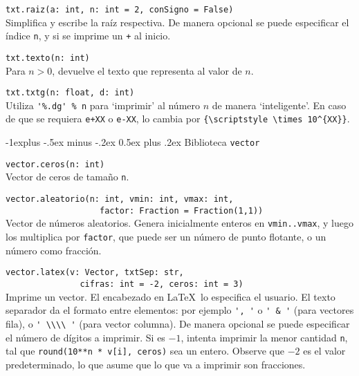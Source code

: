\documentclass[10pt,landscape]{article}
\makeatletter
\renewcommand{\subsection}{\@startsection{subsection}{2}{0mm}%
                                {-1explus -.5ex minus -.2ex}%
                                {0.5ex plus .2ex}%
                                {\normalfont\normalsize\bfseries}}
\makeatother
\begin{document}
\begin{multicols}{3}
\begin{asparaitem}
\item  \verb|txt.raiz(a: int, n: int = 2, conSigno = False)| \\
\quad Simplifica y escribe la raíz respectiva. De manera opcional se puede especificar el \'indice \verb|n|, y si se imprime un \verb|+| al inicio.

\item \verb|txt.texto(n: int)| \\
\quad Para $n > 0$, devuelve el texto que representa al valor de $n$.

\item \verb|txt.txtg(n: float, d: int)| \\
  \quad Utiliza \verb|'%.dg' % n| para `imprimir' al n\'umero $n$ de manera `inteligente'. En caso de que se requiera \verb|e+XX| o \verb|e-XX|, lo cambia por \verb|{\scriptstyle \times 10^{XX}}|.
\end{asparaitem}

\subsection{Biblioteca \texttt{vector}}
\begin{asparaitem}
\item \verb|vector.ceros(n: int)| \\
\quad Vector de ceros de tamaño \verb|n|. 

\item \verb|vector.aleatorio(n: int, vmin: int, vmax: int,| \\
  \verb|                   factor: Fraction = Fraction(1,1))| \\
  \quad Vector de números aleatorios. Genera inicialmente enteros en \verb|vmin..vmax|, y luego los multiplica por \verb|factor|, que puede ser un n\'umero de punto flotante, o un n\'umero como fracci\'on.

\item \verb|vector.latex(v: Vector, txtSep: str,| \\
      \verb|               cifras: int = -2, ceros: int = 3)| \\
  \quad Imprime un vector. El encabezado en \LaTeX\ lo especifica el usuario. El texto separador da el formato entre elementos: por ejemplo \verb|', '| o \verb|' & '| (para vectores fila), o \verb|' \\\\ '| (para vector columna). De manera opcional se puede especificar el n\'umero de d\'igitos a imprimir. Si es $-1$, intenta imprimir la menor cantidad \verb|n|, tal que \verb|round(10**n * v[i], ceros)| sea un entero. Observe que $-2$ es el valor predeterminado, lo que asume que lo que va a imprimir son fracciones.


\end{asparaitem}
\end{multicols}
\end{document}
